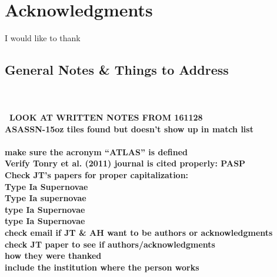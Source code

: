 \documentclass[aps,prb,twocolumn,superscriptaddress]{revtex4-1}
\begin{document}
\section*{Acknowledgments}
I would like to thank   %



\clearpage
\begin{widetext} %
 \section{General Notes \& Things to Address}
 \\
 {\bf ~\\~LOOK AT WRITTEN NOTES FROM 161128\\}
 {\bf ASASSN-15oz tiles found but doesn't show up in match list\\~\\}
 {\bf make sure the acronym ``ATLAS'' is defined\\}
 {\bf Verify Tonry et al. (2011) journal is cited properly: PASP\\}
 {\bf Check JT's papers for proper capitalization:\\
 \indent Type Ia Supernovae\\
 \indent Type Ia supernovae\\
 \indent type Ia Supernovae\\
 \indent type Ia Supernovae\\}
 {\bf check email if JT \& AH want to be authors or acknowledgments}\\
 {\bf check JT paper to see if authors/acknowledgments \\
 \indent how they were thanked\\
 \indent include the institution where the person works}\\

\end{widetext}
\end{document}

